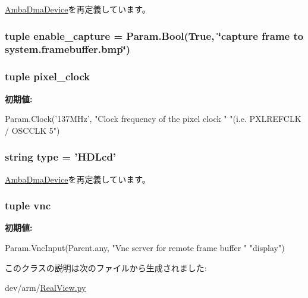 \hyperlink{classRealView_1_1AmbaDmaDevice_a17da7064bc5c518791f0c891eff05fda}{AmbaDmaDevice}を再定義しています。\hypertarget{classRealView_1_1HDLcd_ad54ef6219008e06976486cb101465f9d}{
\subsubsection[{enable\_\-capture}]{\setlength{\rightskip}{0pt plus 5cm}tuple {\bf enable\_\-capture} = Param.Bool(True, \char`\"{}capture frame to system.framebuffer.bmp\char`\"{})}}
\label{classRealView_1_1HDLcd_ad54ef6219008e06976486cb101465f9d}
\hypertarget{classRealView_1_1HDLcd_a1c05724bfa7560d233706f5367017198}{
\subsubsection[{pixel\_\-clock}]{\setlength{\rightskip}{0pt plus 5cm}tuple {\bf pixel\_\-clock}}}
\label{classRealView_1_1HDLcd_a1c05724bfa7560d233706f5367017198}
{\bfseries 初期値:}
\begin{DoxyCode}
Param.Clock('137MHz', "Clock frequency of the pixel clock "
                                        "(i.e. PXLREFCLK / OSCCLK 5")
\end{DoxyCode}
\hypertarget{classRealView_1_1HDLcd_acce15679d830831b0bbe8ebc2a60b2ca}{
\subsubsection[{type}]{\setlength{\rightskip}{0pt plus 5cm}string {\bf type} = '{\bf HDLcd}'}}
\label{classRealView_1_1HDLcd_acce15679d830831b0bbe8ebc2a60b2ca}


\hyperlink{classRealView_1_1AmbaDmaDevice_acce15679d830831b0bbe8ebc2a60b2ca}{AmbaDmaDevice}を再定義しています。\hypertarget{classRealView_1_1HDLcd_afe937f4b2d4f6f3abce13db1d308617d}{
\subsubsection[{vnc}]{\setlength{\rightskip}{0pt plus 5cm}tuple {\bf vnc}}}
\label{classRealView_1_1HDLcd_afe937f4b2d4f6f3abce13db1d308617d}
{\bfseries 初期値:}
\begin{DoxyCode}
Param.VncInput(Parent.any, "Vnc server for remote frame buffer "
                                     "display")
\end{DoxyCode}


このクラスの説明は次のファイルから生成されました:\begin{DoxyCompactItemize}
\item 
dev/arm/\hyperlink{RealView_8py}{RealView.py}\end{DoxyCompactItemize}
